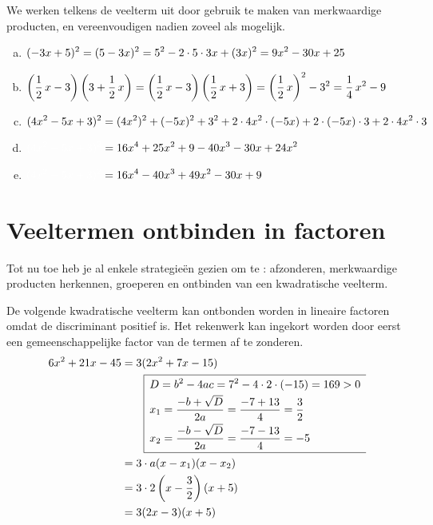 \documentclass{ximera}
\begin{document}
\begin{voorbeeld}
We werken telkens de veelterm uit door gebruik te maken van merkwaardige producten, en vereenvoudigen nadien zoveel als mogelijk.
\begin{enumerate}[(a)]
\item 
$\displaystyle (-3x+5)^2 = (5-3x)^2 = 5^2 - 2 \cdot 5 \cdot 3x + (3x)^2 = 9x^2 - 30x + 25$
\item 
$\displaystyle \left(\frac{1}{2}\,x-3\right)\left(3+\frac{1}{2}\,x\right) = \left(\frac{1}{2}\,x-3\right)\left(\frac{1}{2}\,x+3\right) = \left(\frac{1}{2}\,x\right)^2 - 3^2 = \frac{1}{4}\,x^2 - 9$
\item
$\displaystyle (4x^2 - 5x + 3)^2 = (4x^2)^2 + (-5x)^2 + 3^2 + 2 \cdot 4x^2 \cdot (-5x) + 2\cdot (-5x) \cdot 3 + 2 \cdot 4x^2 \cdot 3$
\item[]
$\D \mph{(4x^2 - 5x + 3)^2} = 16x^4 + 25x^2 + 9 -40x^3 - 30x + 24x^2$
\item[]
$\D \mph{(4x^2 - 5x + 3)^2} = 16x^4 - 40x^3 + 49x^2 - 30x + 9$
\end{enumerate}
\end{voorbeeld} 

\section{Veeltermen ontbinden in factoren}

Tot nu toe heb je al enkele strategie\"en gezien om te : afzonderen, merkwaardige producten herkennen, groeperen en ontbinden van een kwadratische veelterm.

\begin{voorbeeld}
De volgende kwadratische veelterm kan ontbonden worden in lineaire factoren omdat de discriminant positief is. Het rekenwerk kan ingekort worden door eerst een gemeenschappelijke factor van de termen af te zonderen. 
\begin{align*}
6x^2+21x-45 & = 3(2x^2 + 7x - 15) \\
& \qquad 
\begin{array}{|l}
\hline
\begin{aligned}
\vrule height 0.4cm width 0cm
& D = b^2 - 4ac = 7^2-4\cdot 2 \cdot (-15) = 169 > 0 \\[0.1cm] 
& x_{1} = \frac{-b + \sqrt{D}}{2a} = \frac{-7 + 13}{4} = \frac{3}{2} \\[0.1cm] 
& x_{2} = \frac{-b - \sqrt{D}}{2a} = \frac{-7 - 13}{4} = -5 \\[0.1cm]
\end{aligned} \\
\hline
\end{array} \\
& = 3 \cdot a(x-x_1)(x-x_2) \\
& = 3 \cdot 2\left(x- \frac{3}{2}\right)(x+5) \\
& = 3(2x-3)(x+5)
\end{align*}
\end{voorbeeld}
\end{document}
